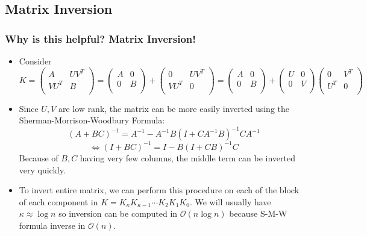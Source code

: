 \documentclass{beamer}
\begin{document}
 \subsection{Matrix Inversion}
 \begin{frame}
 \frametitle{Why is this helpful? Matrix Inversion!}
 \begin{itemize}
 \item Consider $K = \begin{pmatrix} A & UV^T \\ VU^T & B \\ \end{pmatrix} = \begin{pmatrix} A & 0 \\ 0 & B \\ \end{pmatrix}+ \begin{pmatrix} 0 & UV^T \\ VU^T & 0 \\ \end{pmatrix} = \begin{pmatrix} A & 0 \\ 0 & B \\ \end{pmatrix}+ \begin{pmatrix} U & 0 \\ 0 & V \\ \end{pmatrix}\begin{pmatrix} 0 & V^T \\ U^T & 0 \\ \end{pmatrix}$
 \item Since $U,V$ are low rank, the matrix can be more easily inverted using the Sherman-Morrison-Woodbury Formula:
 $$(A+BC)^{-1} = A^{-1} - A^{-1}B(I+CA^{-1}B)^{-1}CA^{-1}$$
 $$\Leftrightarrow (I+BC)^{-1} = I-B(I+CB)^{-1}C$$
 Because of $B,C$ having very few columns, the middle term can be inverted very quickly. 
 \item To invert entire matrix, we can perform this procedure on each of the block of each component in $K = K_\kappa K_{\kappa-1} \cdots K_2 K_1 K_0$. We will usually have $\kappa \approx \log n$ so inversion can be computed in $\mathcal{O}(n\log n)$ because S-M-W formula inverse in $\mathcal{O}(n)$.
 \end{itemize}
 \end{frame}
\end{document}

